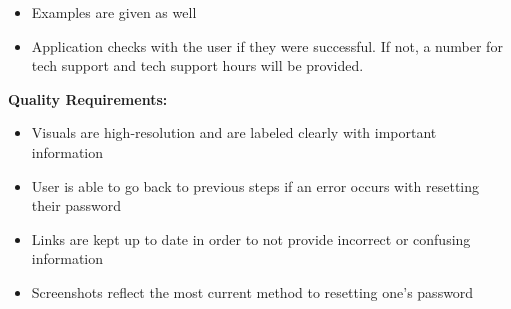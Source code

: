 \documentclass[12pt, letterpaper]{article}
\begin{document}
\begin{enumerate}
\begin{itemize}
	\item Examples are given as well
	\item Application checks with the user if they were successful. If not, a number for tech support and tech support hours will be provided.
\end{itemize}
\textbf{Quality Requirements:}
\begin{itemize}
	\item Visuals are high-resolution and are labeled clearly with important information
	\item User is able to go back to previous steps if an error occurs with resetting their password
	\item Links are kept up to date in order to not provide incorrect or confusing information
	\item Screenshots reflect the most current method to resetting one’s password
\end{itemize}


\end{enumerate}
\end{document}
